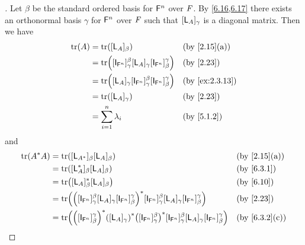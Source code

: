 \begin{proof}[]
  Let \(\beta\) be the standard ordered basis for \(\mathsf{F}^n\) over \(\mathit{F}\).
  By \cref{6.16,6.17} there exists an orthonormal basis \(\gamma\) for \(\mathsf{F}^n\) over \(\mathit{F}\) such that \([\mathsf{L}_A]_{\gamma}\) is a diagonal matrix.
  Then we have
  \begin{align*}
    \tr[A] & = \tr[[\L_A]_{\beta}]                                                                    &  & \by{2.15}[a]   \\
           & = \tr[[\IT[\vs{F}^n]]_{\gamma}^{\beta} [\L_A]_{\gamma} [\IT[\vs{F}^n]]_{\beta}^{\gamma}] &  & \by{2.23}      \\
           & = \tr[[\L_A]_{\gamma} [\IT[\vs{F}^n]]_{\gamma}^{\beta} [\IT[\vs{F}^n]]_{\beta}^{\gamma}] &  & \by{ex:2.3.13} \\
           & = \tr[[\L_A]_{\gamma}]                                                                   &  & \by{2.23}      \\
           & = \sum_{i = 1}^n \lambda_i                                                               &  & \by{5.1.2}
  \end{align*}
  and
  \begin{align*}
    \tr[A^* A] & = \tr[[\L_{A^*}]_{\beta} [\L_A]_{\beta}]                                                                                                                                                        &  & \by{2.15}[a]   \\
               & = \tr[[\L_A^*]_{\beta} [\L_A]_{\beta}]                                                                                                                                                          &  & \by{6.3.1}     \\
               & = \tr[[\L_A]_{\beta}^* [\L_A]_{\beta}]                                                                                                                                                          &  & \by{6.10}      \\
               & = \tr[\pa{[\IT[\vs{F}^n]]_{\gamma}^{\beta} [\L_A]_{\gamma} [\IT[\vs{F}^n]]_{\beta}^{\gamma}}^* [\IT[\vs{F}^n]]_{\gamma}^{\beta} [\L_A]_{\gamma} [\IT[\vs{F}^n]]_{\beta}^{\gamma}]               &  & \by{2.23}      \\
               & = \tr[\pa{[\IT[\vs{F}^n]]_{\beta}^{\gamma}}^* \pa{[\L_A]_{\gamma}}^* \pa{[\IT[\vs{F}^n]]_{\gamma}^{\beta}}^* [\IT[\vs{F}^n]]_{\gamma}^{\beta} [\L_A]_{\gamma} [\IT[\vs{F}^n]]_{\beta}^{\gamma}] &  & \by{6.3.2}[c]  \\

\end{align*}
\end{proof}
